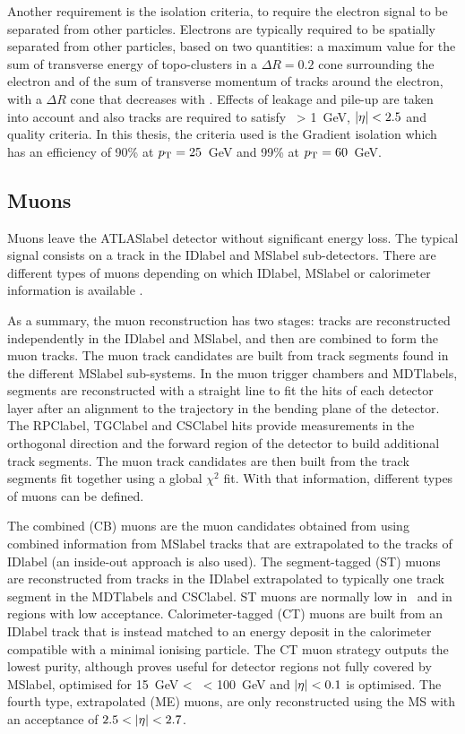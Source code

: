 Another requirement is the isolation criteria, to require the electron signal to be separated from other particles. Electrons are typically required to be spatially separated from other particles, based on two quantities: a maximum value for the sum of transverse energy of topo-clusters in a $\Delta R=0.2$ cone surrounding the electron and of the sum of transverse momentum of tracks around the electron, with a $\Delta R$ cone that decreases with \pT. Effects of leakage and pile-up are taken into account and also tracks are required to satisfy \pT\ > 1~GeV, $\abs{\eta}<2.5$ and quality criteria. In this thesis, the criteria used is the Gradient isolation which has an efficiency of 90\% at $p_{\text{T}} = 25$~GeV and 99\% at $p_{\text{T}} = 60$~GeV.

\subsection{Muons}

Muons leave the \acrshort{ATLASlabel} detector without significant energy loss. The typical signal consists on a track in the \acrshort{IDlabel} and \acrshort{MSlabel} sub-detectors. There are different types of muons depending on which \acrshort{IDlabel}, \acrshort{MSlabel} or calorimeter information is available %
.

As a summary, the muon reconstruction has two stages: tracks are reconstructed independently in the \acrshort{IDlabel} and \acrshort{MSlabel}, and then are combined to form the muon tracks. The muon track candidates are built from track segments found in the different \acrshort{MSlabel} sub-systems. In the muon trigger chambers and \acrshort{MDTlabel}s, segments are reconstructed with a straight line to fit the hits of each detector layer after an alignment to the trajectory in the bending plane of the detector. The \acrshort{RPClabel}, \acrshort{TGClabel} and \acrshort{CSClabel} hits provide measurements in the orthogonal direction and the forward region of the detector to build additional track segments. The muon track candidates are then built from the track segments fit together using a global $\chi^2$ fit. With that information, different types of muons can be defined.

The combined (CB) muons are the muon candidates obtained from using combined information from \acrshort{MSlabel} tracks that are extrapolated to the tracks of \acrshort{IDlabel} (an inside-out approach is also used). The segment-tagged (ST) muons are reconstructed from tracks in the \acrshort{IDlabel} extrapolated to typically one track segment in the \acrshort{MDTlabel}s and \acrshort{CSClabel}. ST muons are normally low in \pT\ and in regions with low acceptance. Calorimeter-tagged (CT) muons are built from an \acrshort{IDlabel} track that is instead matched to an energy deposit in the calorimeter compatible with a minimal ionising particle. The CT muon strategy outputs the lowest purity, although proves useful for detector regions not fully covered by \acrshort{MSlabel}, optimised for 15~GeV < \pT\ < 100~GeV and $\abs{\eta}<0.1$ is optimised. The fourth type, extrapolated (ME) muons, are only reconstructed using the \acrshort{MS} with an acceptance of $2.5 < \abs{\eta} < 2.7$.

